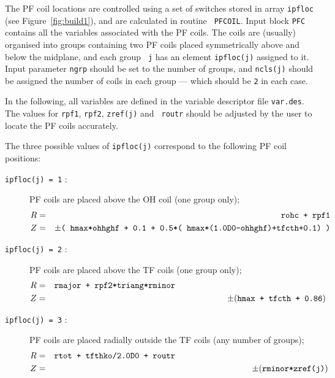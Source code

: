 \documentclass[11pt,a4paper]{report}
\begin{document}
The PF coil locations are controlled using a set of switches stored in array
{\tt ipfloc} (see Figure~\ref{fig:build1}), and are calculated in routine {\tt
PFCOIL}. Input block {\tt PFC} contains all the variables associated with the
PF coils. The coils are (usually) organised into groups containing two PF
coils placed symmetrically above and below the midplane, and each group {\tt
j} has an element {\tt ipfloc(j)} assigned to it. Input parameter {\tt ngrp}
should be set to the number of groups, and {\tt ncls(j)} should be assigned
the number of coils in each group --- which should be {\tt 2} in each case.
\setlength{\parskip}{5mm}

In the following, all variables are defined in the variable descriptor file
{\tt var.des}. The values for {\tt rpf1}, {\tt rpf2}, {\tt zref(j)} and {\tt
routr} should be adjusted by the user to locate the PF coils accurately.

The three possible values of {\tt ipfloc(j)} correspond to the following PF
coil positions:

\setlength{\parskip}{0mm}
\begin{description}
\item [{\tt ipfloc(j) = 1} :]  PF coils are placed above the OH coil (one
group only);
\footnotesize
\begin{eqnarray*}
R & = & \mbox{\tt rohc + rpf1} \\
Z & = & \pm
\mbox{\tt ( hmax*ohhghf + 0.1 + 0.5*( hmax*(1.0D0-ohhghf)+tfcth+0.1) )}
\end{eqnarray*}
\normalsize
\item [{\tt ipfloc(j) = 2} :]  PF coils are placed above the TF coils (one
group only);
\footnotesize
\begin{eqnarray*}
R & = & \mbox{\tt rmajor + rpf2*triang*rminor} \hspace{62mm} \\
Z & = & \pm (\mbox{\tt hmax + tfcth + 0.86})
\end{eqnarray*}
\normalsize
\item [{\tt ipfloc(j) = 3} :]  PF coils are placed radially outside the TF
coils (any number of groups);
\footnotesize
\begin{eqnarray*}
R & = & \mbox{\tt rtot + tfthko/2.0D0 + routr} \hspace{63mm}\\
Z & = & \pm(\mbox{\tt rminor*zref(j)})
\end{eqnarray*}
\normalsize
\end{description}
\end{document}
